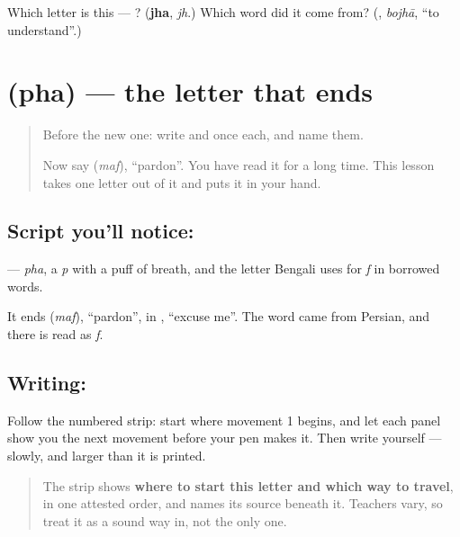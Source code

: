 \begin{tcolorbox}[breakable,colback=teal!4,colframe=teal!35!black,title={Before you move on}]
Which letter is this — ? (\textbf{jha}, \emph{jh}.) Which word did it come from? (\textbf{}, \emph{bojhā}, \textquotedblleft{}to understand\textquotedblright{}.)
\end{tcolorbox}
\section[\texorpdfstring{\bn{ফ} (pha)}{ফ (pha)}]{ (pha) — the letter that ends }

\label{lesson:BN-W41-pha}



\begin{quote}
Before the new one: write  and  once each, and name them.

Now say \textbf{} (\emph{maf}), \textquotedblleft{}pardon\textquotedblright{}. You have read it for a long time. This lesson takes one letter out of it and puts it in your hand.
\end{quote}

\subsection*{Script you'll notice: }
\textbf{} — \emph{pha}, a \emph{p} with a puff of breath, and the letter Bengali uses for \emph{f} in borrowed words.

It ends \textbf{} (\emph{maf}), \textquotedblleft{}pardon\textquotedblright{}, in \textbf{ }, \textquotedblleft{}excuse me\textquotedblright{}. The word came from Persian, and there \textbf{} is read as \emph{f}.

\subsection*{Writing: }

Follow the numbered strip: start where movement 1 begins, and let each panel show you the next movement before your pen makes it. Then write  yourself — slowly, and larger than it is printed.

\begin{quote}
The strip shows \textbf{where to start this letter and which way to travel}, in one attested order, and names its source beneath it. Teachers vary, so treat it as a sound way in, not the only one.
\end{quote}

